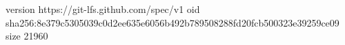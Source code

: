 version https://git-lfs.github.com/spec/v1
oid sha256:8e379c5305039c0d2ee635e6056b492b789508288fd20fcb500323e39259ce09
size 21960
